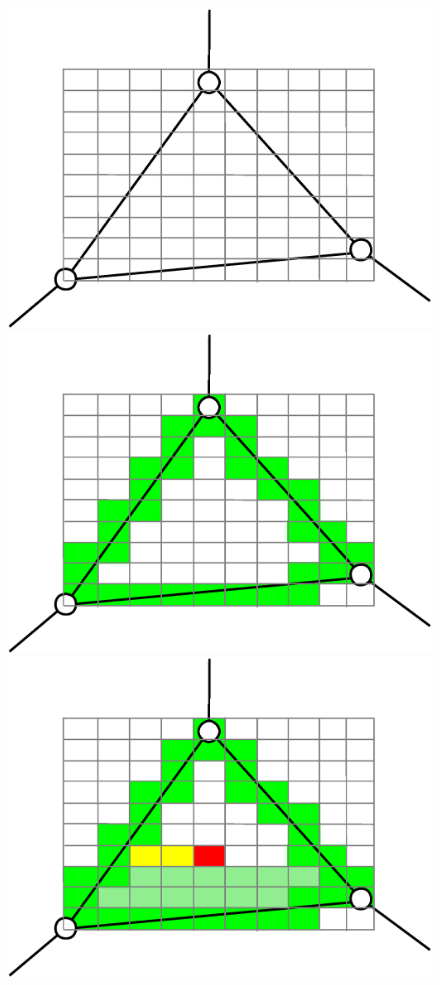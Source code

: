 \begin{figure}
\centering
\includegraphics[scale=0.25]{../img/voxelize_1.eps}
\includegraphics[scale=0.25]{../img/voxelize_2.eps}\\
\includegraphics[scale=0.25]{../img/voxelize_3.eps}

\end{figure}

